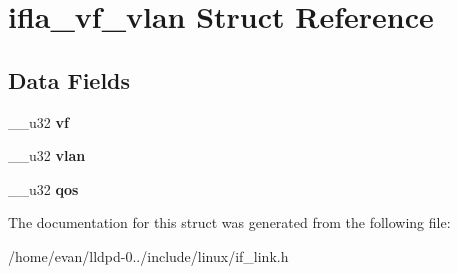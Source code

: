 \section{ifla\-\_\-vf\-\_\-vlan \-Struct \-Reference}
\label{structifla__vf__vlan}
\subsection*{\-Data \-Fields}
\begin{DoxyCompactItemize}
\item 
\-\_\-\-\_\-u32 {\bfseries vf}\label{structifla__vf__vlan_ac91d1ffe1c2fd7c6c010563893822165}

\item 
\-\_\-\-\_\-u32 {\bfseries vlan}\label{structifla__vf__vlan_aa37821c1890de7fe1015793afa35548a}

\item 
\-\_\-\-\_\-u32 {\bfseries qos}\label{structifla__vf__vlan_a04d2d85d781c7b24a61d3e6788f4320e}

\end{DoxyCompactItemize}


\-The documentation for this struct was generated from the following file\-:\begin{DoxyCompactItemize}
\item 
/home/evan/lldpd-\/0../include/linux/if\-\_\-link.\-h\end{DoxyCompactItemize}
